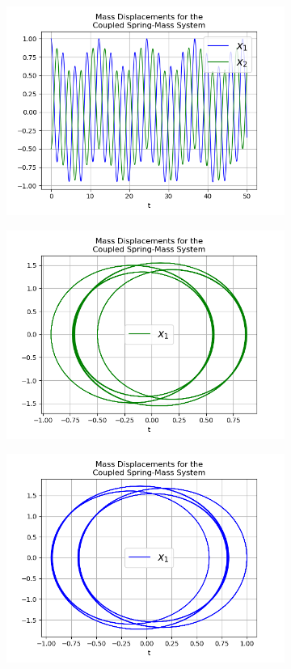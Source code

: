 \documentclass{article}
\begin{document}
\begin{figure}[h!]
\begin{subfigure}[b]{0.32\linewidth}
    \includegraphics[width=\linewidth]{two_springs315.png}
    \caption{}
  \end{subfigure}
  \begin{subfigure}[b]{0.45\linewidth}
    \includegraphics[width=\linewidth]{two_springs314.png}
    \caption{}
  \end{subfigure}
  \begin{subfigure}[b]{0.45\linewidth}
    \includegraphics[width=\linewidth]{two_springs313.png}

\end{subfigure}
\end{figure}
\end{document}
